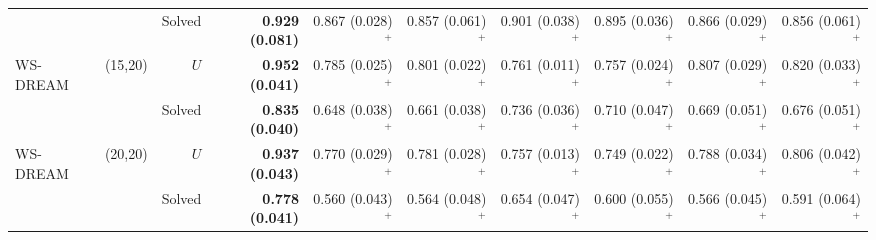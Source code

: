 \begin{tabular}{llrrrrrrrr}
 &  & Solved & \textbf{0.929 (0.081)} & 0.867 (0.028)$^{+}$ & 0.857 (0.061)$^{+}$ & 0.901 (0.038)$^{+}$ & 0.895 (0.036)$^{+}$ & 0.866 (0.029)$^{+}$ & 0.856 (0.061)$^{+}$\\
WS-DREAM & (15,20) & $U$ & \textbf{0.952 (0.041)} & 0.785 (0.025)$^{+}$ & 0.801 (0.022)$^{+}$ & 0.761 (0.011)$^{+}$ & 0.757 (0.024)$^{+}$ & 0.807 (0.029)$^{+}$ & 0.820 (0.033)$^{+}$\\
 &  & Solved & \textbf{0.835 (0.040)} & 0.648 (0.038)$^{+}$ & 0.661 (0.038)$^{+}$ & 0.736 (0.036)$^{+}$ & 0.710 (0.047)$^{+}$ & 0.669 (0.051)$^{+}$ & 0.676 (0.051)$^{+}$\\
WS-DREAM & (20,20) & $U$ & \textbf{0.937 (0.043)} & 0.770 (0.029)$^{+}$ & 0.781 (0.028)$^{+}$ & 0.757 (0.013)$^{+}$ & 0.749 (0.022)$^{+}$ & 0.788 (0.034)$^{+}$ & 0.806 (0.042)$^{+}$\\
 &  & Solved & \textbf{0.778 (0.041)} & 0.560 (0.043)$^{+}$ & 0.564 (0.048)$^{+}$ & 0.654 (0.047)$^{+}$ & 0.600 (0.055)$^{+}$ & 0.566 (0.045)$^{+}$ & 0.591 (0.064)$^{+}$\\
\bottomrule
\end{tabular}